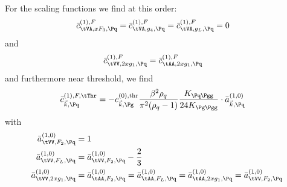 For the scaling functions we find at this order:
\begin{align}
\bar c_{\tVA,xF_3,\Pq}^{(1),F} &= \bar c_{\tVA,g_4,\Pq}^{(1),F} = \bar c_{\tVA,g_L,\Pq}^{(1),F} = 0
\end{align}
and 
\begin{align}
\bar c_{\tVV,2xg_1,\Pq}^{(1),F} &= \bar c_{\tAA,2xg_1,\Pq}^{(1),F}
\end{align}
and furthermore near threshold, we find
\begin{align}
\bar c_{\vec k,\Pq}^{(1),F,\tThr} &= -c_{\vec k,\Pg}^{(0),\text{thr}} \frac{\beta^2\rho_q}{\pi^2(\rho_q-1)} \frac{K_{\Pq\Pgg}}{24K_{\Pg\Pgg}} \cdot \bar a_{\vec k,\Pq}^{(1,0)}
\end{align}
with
\begin{align}
\bar a^{(1,0)}_{\tVV,F_2,\Pq} &= 1\\
\bar a^{(1,0)}_{\tVV,F_L,\Pq} &= \bar a^{(1,0)}_{\tVV,F_2,\Pq} - \frac 2 {3}\\
\bar a^{(1,0)}_{\tVV,2xg_1,\Pq} &= \bar a^{(1,0)}_{\tAA,F_2,\Pq} = \bar a^{(1,0)}_{\tAA,F_L,\Pq} = \bar a^{(1,0)}_{\tAA,2xg_1,\Pq} = \bar a^{(1,0)}_{\tVV,F_2,\Pq}
\end{align}

